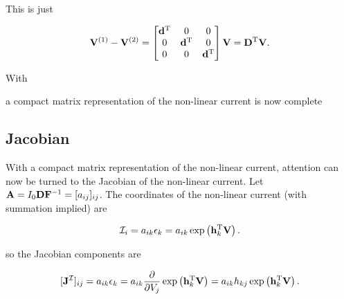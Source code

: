 This is just

\begin{equation}\label{eqn:ece1254projectReport:1400}
\BV^{(1)} - \BV^{(2)}
=
\begin{bmatrix}
\Bd^\T & 0 & 0 \\
0 & \Bd^\T & 0 \\
0 & 0 & \Bd^\T \\
\end{bmatrix}
\BV
= \BD^\T \BV.
\end{equation}

With

a compact matrix representation of the non-linear current is now complete


\subsection{Jacobian}

With a compact matrix representation of the non-linear current, attention can now be turned to the Jacobian of the non-linear current.
Let \( \mathbf{A} = I_0 \mathbf{D} \mathbf{F}^{-1} = [ a_{ij} ]_{ij} \).
The coordinates of the non-linear current (with summation implied) are

\begin{dmath}\label{eqn:ece1254projectReport:1120}
\mathcal{I}_i = a_{ik} \epsilon_k = a_{ik} \exp\lr{ \Bh_k^\T \BV }.
\end{dmath}

so the Jacobian components are

\begin{dmath}\label{eqn:ece1254projectReport:1140}
[\BJ^{\mathcal{I}}]_{ij}
=
a_{ik} \epsilon_k = a_{ik}
\PD{V_j}{}
\exp\lr{ \Bh_k^\T \BV }
=
a_{ik}
h_{kj}
\exp\lr{ \Bh_k^\T \BV }.
\end{dmath}

